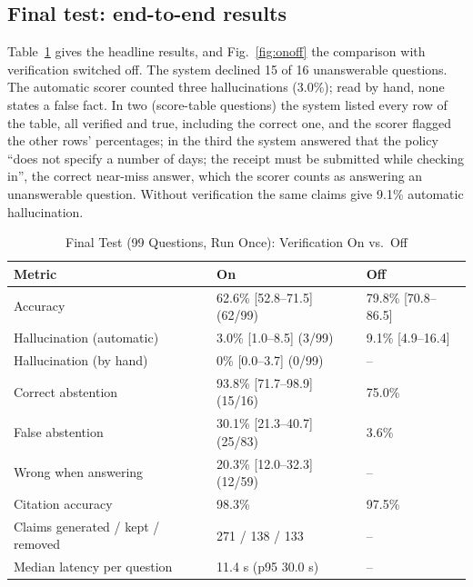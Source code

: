 \documentclass[conference]{IEEEtran}
\begin{document}
\subsection{Final test: end-to-end results}
Table~\ref{tab:final} gives the headline results, and Fig.~\ref{fig:onoff} the comparison with
verification switched off. The system declined 15 of 16 unanswerable questions. The automatic scorer counted
three hallucinations (3.0\%); read by hand, none states a false fact. In two (score-table questions) the
system listed every row of the table, all verified and true, including the correct one, and the scorer
flagged the other rows' percentages; in the third the system answered that the policy ``does not specify a
number of days; the receipt must be submitted while checking in'', the correct near-miss answer, which the
scorer counts as answering an unanswerable question. Without verification the same claims give 9.1\%
automatic hallucination.

\begin{table}[t]
\caption{Final Test (99 Questions, Run Once): Verification On vs.\ Off}
\label{tab:final}
\centering\scriptsize
\begin{tabular}{@{}lll@{}}
\toprule
Metric & On & Off\\
\midrule
Accuracy & 62.6\% [52.8--71.5] (62/99) & 79.8\% [70.8--86.5]\\
Hallucination (automatic) & 3.0\% [1.0--8.5] (3/99) & 9.1\% [4.9--16.4]\\
Hallucination (by hand) & 0\% [0.0--3.7] (0/99) & --\\
Correct abstention & 93.8\% [71.7--98.9] (15/16) & 75.0\%\\
False abstention & 30.1\% [21.3--40.7] (25/83) & 3.6\%\\
Wrong when answering & 20.3\% [12.0--32.3] (12/59) & --\\
Citation accuracy & 98.3\% & 97.5\%\\
Claims generated / kept / removed & 271 / 138 / 133 & --\\
Median latency per question & 11.4 s (p95 30.0 s) & --\\
\bottomrule
\end{tabular}
\end{table}
\end{document}
